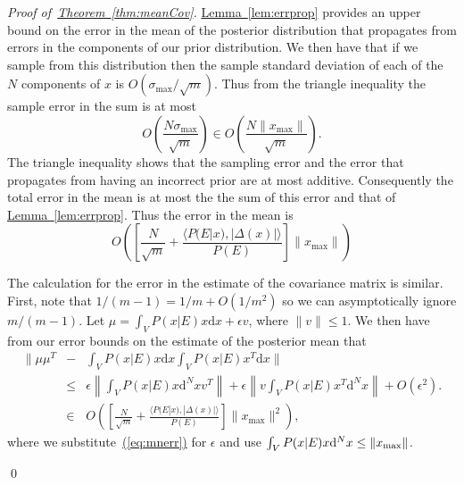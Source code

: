 \documentclass{article} %
\newenvironment{proofof}[1]{\begin{trivlist}\item[]{\flushleft\it
Proof of~#1.}}
{\qed\end{trivlist}}
\newcommand{\eq}[1]{\hyperref[eq:#1]{(\ref*{eq:#1})}}
\newcommand{\thm}[1]{\hyperref[thm:#1]{Theorem~\ref*{thm:#1}}}
\newcommand{\lem}[1]{\hyperref[lem:#1]{Lemma~\ref*{lem:#1}}}
\begin{document}
\begin{proofof}{\thm{meanCov}}
\lem{errprop} provides an upper bound on the error in the mean of the posterior distribution that propagates from errors in the components of our prior distribution.  We then have that if we sample from this distribution then the sample standard deviation of each of the $N$ components of $x$ is $O(\sigma_{\max}/\sqrt{m})$.  Thus from the triangle inequality the sample error in the sum is at most 
\begin{equation}
O\left(\frac{{N}\sigma_{\max}}{\sqrt{m}}\right)\in O\left( \frac{N\|x_{\max}\|}{\sqrt{m}}\right).
\end{equation}  
The triangle inequality shows that the sampling error and the error that propagates from having an incorrect prior are at most additive.  Consequently the total error in the mean is at most the the sum of this error and that of \lem{errprop}.  Thus the error in the mean is
\begin{equation}
O\left(\left[\frac{N}{\sqrt{m}}+ \frac{\langle P(E|x),|\Delta(x)|\rangle}{P(E)}\right]\|x_{\max}\| \right)\label{eq:mnerr}
\end{equation}

 The calculation for the error in the estimate of the covariance matrix is similar.  First, note that $1/(m-1)= 1/m +O(1/m^2)$ so we can asymptotically ignore $m/(m-1)$.  Let $\mu = \int_V P(x|E) x\mathrm{d}x +\epsilon v$, where $\|v\|\le 1$.  We then have from our error bounds on the estimate of the posterior mean that
\begin{eqnarray}
\| \mu\mu^T &-& \int_V P(x|E) x\mathrm{d}x \int_V P(x|E) x^T\mathrm{d}x \|\nonumber \\&\le& \epsilon \left\|\int_V P(x|E) x\mathrm{d}^Nx v^T\right\|+\epsilon\left\|v\int_V  P(x|E) x^T\mathrm{d}^Nx\right\| + O(\epsilon^2).\nonumber\\
&\in&  O\left(\left[\frac{{N}}{\sqrt{m}} +\frac{\langle P(E|x), |\Delta(x)|\rangle}{P(E)}\right]\|x_{\max}\|^2\right),\label{eq:garbage}
\end{eqnarray}
where we substitute~\eq{mnerr} for $\epsilon$ and use $\int_V P(x|E) x\mathrm{d}^Nx\le \|x_{\rm max}\|$.


\end{proofof}
\end{document}
